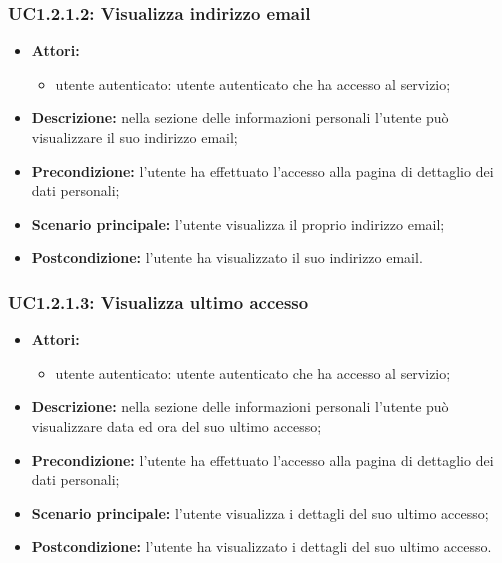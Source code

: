 \subsubsection{UC1.2.1.2: Visualizza indirizzo email}
\begin{itemize}
	\item \textbf{Attori:}
	\begin{itemize}
		\item utente autenticato: utente autenticato che ha accesso al servizio;
	\end{itemize}
	\item \textbf{Descrizione:} nella sezione delle informazioni personali l'utente può visualizzare il suo indirizzo email;
	\item \textbf{Precondizione:} l'utente ha effettuato l'accesso alla pagina di dettaglio dei dati personali;
	\item \textbf{Scenario principale:} l'utente visualizza il proprio indirizzo email;
	\item \textbf{Postcondizione:} l'utente ha visualizzato il suo indirizzo email.
\end{itemize}

\subsubsection{UC1.2.1.3: Visualizza ultimo accesso}
\begin{itemize}
	\item \textbf{Attori:}
	\begin{itemize}
		\item utente autenticato: utente autenticato che ha accesso al servizio;
	\end{itemize}
	\item \textbf{Descrizione:} nella sezione delle informazioni personali l'utente può visualizzare data ed ora del suo ultimo accesso;
	\item \textbf{Precondizione:} l'utente ha effettuato l'accesso alla pagina di dettaglio dei dati personali;
	\item \textbf{Scenario principale:} l'utente visualizza i dettagli del suo ultimo accesso;
	\item \textbf{Postcondizione:} l'utente ha visualizzato i dettagli del suo ultimo accesso.
\end{itemize}

